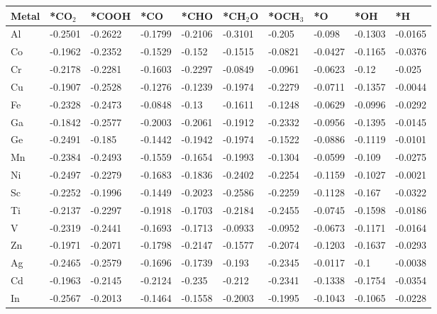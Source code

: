 \begin{table}[h]
  \centering
  {\fontsize{6}{12}\selectfont
  \begin{tabular}{*{10}{l}}
      \hline
      Metal & *CO$_2$ & *COOH& *CO     & *CHO    & *CH$_2$O& *OCH$_3$& *O      & *OH     & *H      \\
      \hline
      Al & -0.2501 & -0.2622 & -0.1799 & -0.2106 & -0.3101 & -0.205  & -0.098  & -0.1303 & -0.0165 \\
      Co & -0.1962 & -0.2352 & -0.1529 & -0.152  & -0.1515 & -0.0821 & -0.0427 & -0.1165 & -0.0376 \\
      Cr & -0.2178 & -0.2281 & -0.1603 & -0.2297 & -0.0849 & -0.0961 & -0.0623 & -0.12   & -0.025  \\
      Cu & -0.1907 & -0.2528 & -0.1276 & -0.1239 & -0.1974 & -0.2279 & -0.0711 & -0.1357 & -0.0044 \\
      Fe & -0.2328 & -0.2473 & -0.0848 & -0.13   & -0.1611 & -0.1248 & -0.0629 & -0.0996 & -0.0292 \\
      Ga & -0.1842 & -0.2577 & -0.2003 & -0.2061 & -0.1912 & -0.2332 & -0.0956 & -0.1395 & -0.0145 \\
      Ge & -0.2491 & -0.185  & -0.1442 & -0.1942 & -0.1974 & -0.1522 & -0.0886 & -0.1119 & -0.0101 \\
      Mn & -0.2384 & -0.2493 & -0.1559 & -0.1654 & -0.1993 & -0.1304 & -0.0599 & -0.109  & -0.0275 \\
      Ni & -0.2497 & -0.2279 & -0.1683 & -0.1836 & -0.2402 & -0.2254 & -0.1159 & -0.1027 & -0.0021 \\
      Sc & -0.2252 & -0.1996 & -0.1449 & -0.2023 & -0.2586 & -0.2259 & -0.1128 & -0.167  & -0.0322 \\
      Ti & -0.2137 & -0.2297 & -0.1918 & -0.1703 & -0.2184 & -0.2455 & -0.0745 & -0.1598 & -0.0186 \\
      V  & -0.2319 & -0.2441 & -0.1693 & -0.1713 & -0.0933 & -0.0952 & -0.0673 & -0.1171 & -0.0164 \\
      Zn & -0.1971 & -0.2071 & -0.1798 & -0.2147 & -0.1577 & -0.2074 & -0.1203 & -0.1637 & -0.0293 \\
      Ag & -0.2465 & -0.2579 & -0.1696 & -0.1739 & -0.193  & -0.2345 & -0.0117 & -0.1    & -0.0038 \\
      Cd & -0.1963 & -0.2145 & -0.2124 & -0.235  & -0.212  & -0.2341 & -0.1338 & -0.1754 & -0.0354 \\
      In & -0.2567 & -0.2013 & -0.1464 & -0.1558 & -0.2003 & -0.1995 & -0.1043 & -0.1065 & -0.0228 \\

\end{tabular}}
\end{table}
